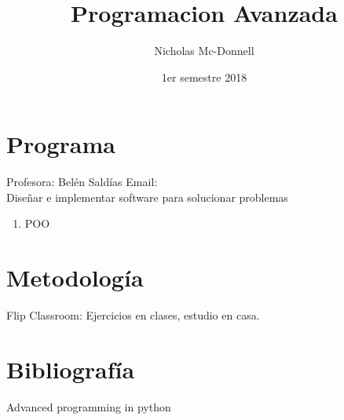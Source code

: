 

\title{Programacion Avanzada}
\author{Nicholas Mc-Donnell}
\date{1er semestre 2018}



    \maketitle

    \section*{Programa}
    {\raggedleft Profesora: Belén Saldías}
    Email: \\
    Diseñar e implementar software para solucionar problemas
    \begin{enumerate}
        \item POO

    \end{enumerate}

    \section*{Metodología}
    Flip Classroom: Ejercicios en clases, estudio en casa.

    \section*{Bibliografía}
    Advanced programming in python

    \newpage

    \tableofcontents

